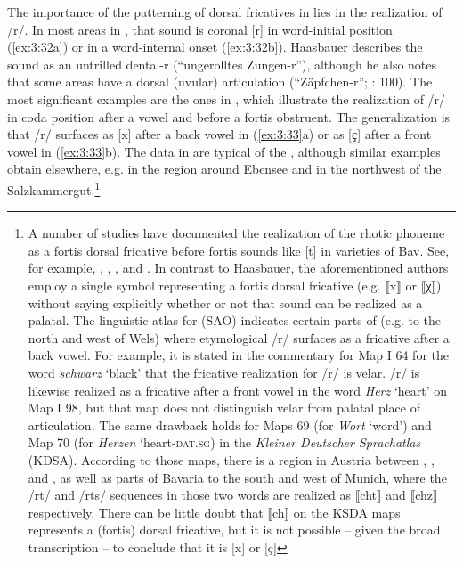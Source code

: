The importance of the patterning of dorsal fricatives in  lies in the realization of /r/. In most areas in , that sound is coronal [r] in word-initial position (\ref{ex:3:32a}) or in a word-internal onset (\ref{ex:3:32b}). Haasbauer describes the sound as an untrilled dental-r (“ungerolltes Zungen-r”), although he also notes that some areas have a dorsal (uvular) articulation (“Zäpfchen-r”; \citealt{Haasbauer1924}: 100). The most significant examples are the ones in , which illustrate the realization of /r/ in coda position after a vowel and before a fortis obstruent. The generalization is that /r/ surfaces as [x] after a back vowel in (\ref{ex:3:33}a) or as [{ҫ}] after a front vowel in (\ref{ex:3:33}b). The data in  are typical of the , although similar examples obtain elsewhere, e.g. in the region around Ebensee and in the northwest of the Salzkammergut.\footnote{{A number of studies have documented the realization of the rhotic phoneme as a fortis dorsal fricative before fortis sounds like [t] in varieties of Bav. See, for example, \citet[77--78]{Schönberger1934}, \citet[203--207]{Roitinger1954}, \citet[124--127]{Kranzmayer1956}, and \citet[298--299]{Zehetner1978}. In contrast to Haasbauer, the aforementioned authors employ a single symbol representing a fortis dorsal fricative (e.g. ⟦x⟧ or ⟦χ⟧) without saying explicitly whether or not that sound can be realized as a palatal. The linguistic atlas for  (SAO) indicates certain parts of  (e.g. to the north and west of Wels) where etymological /r/ surfaces as a fricative after a back vowel. For example, it is stated in the commentary for Map I 64 for the word} {\textit{schwarz}} {‘black’ that the fricative realization for /r/ is velar. /r/ is likewise realized as a fricative after a front vowel in the word} {\textit{Herz}} {‘heart’ on Map I 98, but that map does not distinguish velar from palatal place of articulation. The same drawback holds for Maps 69 (for} {\textit{Wort} }{‘word’) and Map 70 (for} {\textit{Herzen}} {‘heart-}{\textsc{dat}.\textsc{sg}}{) in the} {\textit{Kleiner Deutscher Sprachatlas} }{(KDSA). According to those maps, there is a region in Austria between , , and , as well as parts of Bavaria to the south and west of Munich, where the /rt/ and /rts/ sequences in those two words are realized as ⟦cht⟧ and ⟦chz⟧ respectively. There can be little doubt that ⟦ch⟧ on the KSDA maps represents a (fortis) dorsal fricative, but it is not possible -- given the broad transcription -- to conclude that it is [x] or [ç]}}


